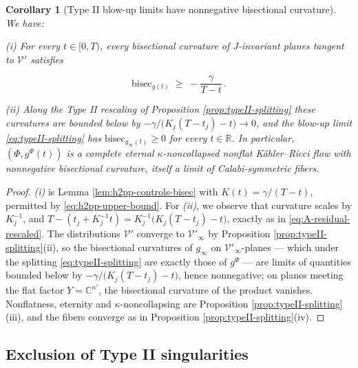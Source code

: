 \documentclass[11pt]{amsart}
\theoremstyle{plain}
\numberwithin{equation}{section}
\newtheorem{corollary}[theorem]{Corollary}
\theoremstyle{definition}
\theoremstyle{remark}
\begin{document}
\begin{corollary}[Type II blow-up limits have nonnegative bisectional curvature]\label{cor:bisec-lower-bound} We have:
	
	{(i)} For every $t \in [ 0, T )$, every bisectional curvature of $J$-invariant planes tangent to $\mathcal{V}'$ satisfies
	
	\begin{equation}\label{eq:bisec-lower-bound}
		\mathrm{bisec}_{g (t)} \;\geq\; - \frac{\gamma}{T - t} \,.
	\end{equation}
	
	{(ii)} Along the Type II rescaling of Proposition \ref{prop:typeII-splitting} these curvatures are bounded below by $- \gamma / \big( K_j ( T - t_j ) - t \big) \to 0$, and the blow-up limit \eqref{eq:typeII-splitting} has $\mathrm{bisec}_{g_\infty (t)} \geq 0$ for every $t \in \mathbb{R}$. In particular, $( \Phi, g^\Phi (t) )$ is a complete eternal $\kappa$-noncollapsed \emph{nonflat} Kähler--Ricci flow with \emph{nonnegative bisectional curvature}, itself a limit of Calabi-symmetric fibers.
	
\end{corollary}

\begin{proof}
	\emph{(i)} is Lemma \ref{lem:h2pp-controls-bisec} with $K (t) = \gamma / ( T - t )$, permitted by \eqref{eq:h2pp-upper-bound}. For \emph{(ii)}, we observe that curvature scales by $K_j^{- 1}$, and $T - ( t_j + K_j^{- 1} t ) = K_j^{- 1} \big( K_j ( T - t_j ) - t \big)$, exactly as in \eqref{eq:A-residual-rescaled}. The distributions $\mathcal{V}'$ converge to $\mathcal{V}'_\infty$ by Proposition \ref{prop:typeII-splitting}(ii), so the bisectional curvatures of $g_\infty$ on $\mathcal{V}'_\infty$-planes --- which under the splitting \eqref{eq:typeII-splitting} are exactly those of $g^\Phi$ --- are limits of quantities bounded below by $- \gamma / \big( K_j ( T - t_j ) - t \big)$, hence nonnegative; on planes meeting the flat factor $Y = \mathbb{C}^{n'}$, the bisectional curvature of the product vanishes. Nonflatness, eternity and $\kappa$-noncollapsing are Proposition \ref{prop:typeII-splitting}(iii), and the fibers converge as in Proposition \ref{prop:typeII-splitting}(iv).
\end{proof}



\subsection{Exclusion of Type II singularities}\label{subsec:no-typeII}
\end{document}
